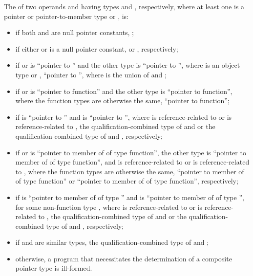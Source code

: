 \pnum
{}%
The  of
two operands  and
 having types  and , respectively, where at least one is a
pointer or pointer-to-member type or
, is:
\begin{itemize}
\item
if both  and  are null pointer constants,
;

\item
if either  or  is a null pointer constant,  or ,
respectively;

\item
if  or  is ``pointer to  '' and the
other type is ``pointer to  '',
where  is an object type or ,
``pointer to  '',
where  is the union of  and ;

\item
if  or  is ``pointer to  function'' and the
other type is ``pointer to function'', where the function types are otherwise the same,
``pointer to function'';

\item
if  is ``pointer to  '' and  is ``pointer to
 '', where  is reference-related to  or  is
reference-related to ,
the qualification-combined type
of  and  or the qualification-combined type of  and ,
respectively;

\item
if  or  is
``pointer to member of  of type function'',
the other type is
``pointer to member of  of type  function'', and
 is reference-related to  or
 is reference-related to ,
where the function types are otherwise the same,
``pointer to member of  of type function'' or
``pointer to member of  of type function'', respectively;

\item
if  is
``pointer to member of  of type  '' and
 is
``pointer to member of  of type  '',
for some non-function type ,
where  is
reference-related to  or  is reference-related to
, the qualification-combined type of  and  or the qualification-combined type
of  and , respectively;

\item
if  and  are similar types, the qualification-combined type of  and
;

\item
otherwise, a program that necessitates the determination of a
composite pointer type is ill-formed.
\end{itemize}

